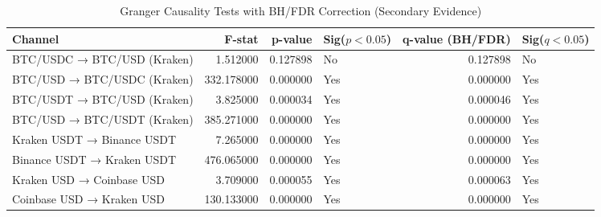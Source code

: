 \begin{table}[H]
\caption{Granger Causality Tests with BH/FDR Correction (Secondary Evidence)}
\label{tab:granger_fdr}
\begin{tabular}{lrrlrl}
\toprule
Channel & F-stat & p-value & Sig($p<0.05$) & q-value (BH/FDR) & Sig($q<0.05$) \\
\midrule
BTC/USDC → BTC/USD (Kraken) & 1.512000 & 0.127898 & No & 0.127898 & No \\
BTC/USD → BTC/USDC (Kraken) & 332.178000 & 0.000000 & Yes & 0.000000 & Yes \\
BTC/USDT → BTC/USD (Kraken) & 3.825000 & 0.000034 & Yes & 0.000046 & Yes \\
BTC/USD → BTC/USDT (Kraken) & 385.271000 & 0.000000 & Yes & 0.000000 & Yes \\
Kraken USDT → Binance USDT & 7.265000 & 0.000000 & Yes & 0.000000 & Yes \\
Binance USDT → Kraken USDT & 476.065000 & 0.000000 & Yes & 0.000000 & Yes \\
Kraken USD → Coinbase USD & 3.709000 & 0.000055 & Yes & 0.000063 & Yes \\
Coinbase USD → Kraken USD & 130.133000 & 0.000000 & Yes & 0.000000 & Yes \\
\bottomrule
\end{tabular}
\end{table}
